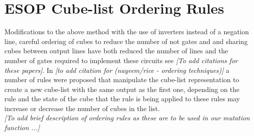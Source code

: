 \section{ESOP Cube-list Ordering Rules}


Modifications to the above method with the use of inverters instead of a negation line, careful ordering 
of cubes to reduce the number of not gates and and sharing cubes between output lines have both reduced 
the number of lines and the number of gates required to implement these circuits see \emph{[To add citations for these papers]}.  
In \emph{[to add citation for (nayeem/rice - ordering techniques)]} a number of rules were proposed that 
manipulate the cube-list representation to create a new cube-list with the same output as the first one, 
depending on the rule and the state of the cube that the rule is being applied to these rules may increase 
or decrease the number of cubes in the list.\\


\noindent \emph{[To add brief description of ordering rules as these are to be used in our mutation function ...]}